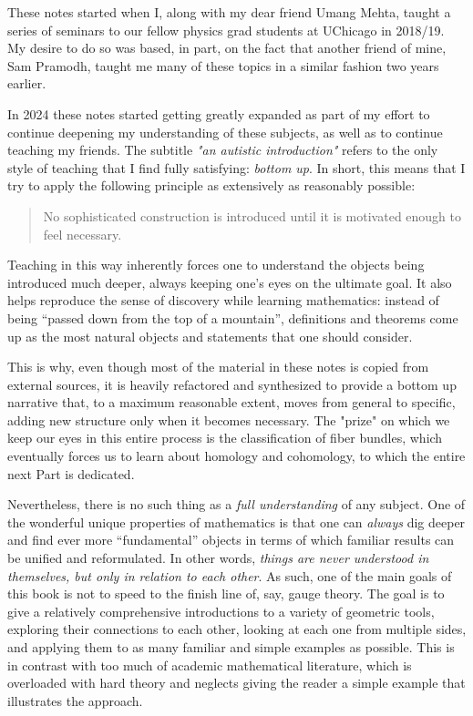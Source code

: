 
These notes started when I, along with my dear friend Umang Mehta, taught a series of seminars to our fellow physics grad students at UChicago in 2018/19. My desire to do so was based, in part, on the fact that another friend of mine, Sam Pramodh, taught me many of these topics in a similar fashion two years earlier.

In 2024 these notes started getting greatly expanded as part of my effort to continue deepening my understanding of these subjects, as well as to continue teaching my friends. The subtitle \emph{"an autistic introduction"} refers to the only style of teaching that I find fully satisfying: \emph{bottom up}. In short, this means that I try to apply the following principle as extensively as reasonably possible:
\begin{quote}
    No sophisticated construction is introduced until it is motivated enough to feel necessary.
\end{quote}
Teaching in this way inherently forces one to understand the objects being introduced much deeper, always keeping one's eyes on the ultimate goal. It also helps reproduce the sense of discovery while learning mathematics: instead of being ``passed down from the top of a mountain'', definitions and theorems come up as the most natural objects and statements that one should consider. 

This is why, even though most of the material in these notes is copied from external sources, it is heavily refactored and synthesized to provide a bottom up narrative that, to a maximum reasonable extent, moves from general to specific, adding new structure only when it becomes necessary. The "prize" on which we keep our eyes in this entire process is the classification of fiber bundles, which eventually forces us to learn about homology and cohomology, to which the entire next Part is dedicated. 

Nevertheless, there is no such thing as a \emph{full understanding} of any subject. One of the wonderful unique properties of mathematics is that one can \emph{always} dig deeper and find ever more ``fundamental'' objects in terms of which familiar results can be unified and reformulated. In other words, \emph{things are never understood in themselves, but only in relation to each other}. As such, one of the main goals of this book is not to speed to the finish line of, say, gauge theory. The goal is to give a relatively comprehensive introductions to a variety of geometric tools, exploring their connections to each other, looking at each one from multiple sides, and applying them to as many familiar and simple examples as possible. This is in contrast with too much of academic mathematical literature, which is overloaded with hard theory and neglects giving the reader a simple example that illustrates the approach.

